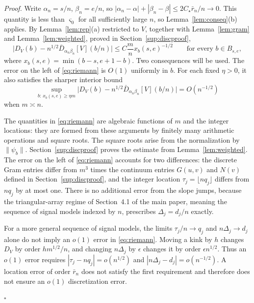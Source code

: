 \documentclass[12pt, a4paper]{article}
\newcommand{\qed}{\hfill$\square$}
\newenvironment{proof}[1][Proof]{\par\noindent\textit{#1.}\space}{\qed\par\medskip}
\begin{document}
\begin{proof}
Write $\alpha_n = s/n$, $\beta_n = e/n$, so
$|\alpha_n-\alpha| + |\beta_n-\beta| \le 2C_\star\bar r_n/n \to 0$. This
quantity is less than $\varsigma_0$ for all sufficiently large $n$, so
Lemma~\ref{lem:conseq}(b) applies. By
Lemma~\ref{lem:rep}(a) restricted to $V$, together with Lemma~\ref{lem:gram}
and Lemma~\ref{lem:weighted}, proved in Section~\ref{sup:discproof},
\begin{equation}
\label{eq:riemann}
\Big|D_V(b)-n^{1/2}\bar D_{\alpha_n\beta_n}[V](b/n)\Big|
\le C\frac{m}{n}x_b(s,e)^{-1/2}
\qquad\text{for every }b\in B_{s,e},
\end{equation}
where $x_b(s,e)=\min(b-s,e+1-b)$. Two consequences will be used. The error
on the left of \eqref{eq:riemann} is $O(1)$ uniformly in $b$. For each fixed
$\eta>0$, it also satisfies the sharper interior bound
\begin{equation}
\label{eq:riemann2}
\sup_{b:\,x_b(s,e)\ge\eta m}
\Big|D_V(b)-n^{1/2}\bar D_{\alpha_n\beta_n}[V](b/n)\Big|
=O(n^{-1/2})
\end{equation}
when $m\asymp n$.

The quantities in \eqref{eq:riemann} are algebraic functions of $m$ and the
integer locations: they are formed from these arguments by finitely many
arithmetic operations and square roots. The square roots arise from the
normalization by $\|\psi_b\|$. Section~\ref{sup:discproof} proves the estimate
from Lemma~\ref{lem:weighted}. The error on the left of \eqref{eq:riemann}
accounts for two differences: the discrete Gram entries differ from $m^3$
times the continuum entries $G(u,v)$ and $N(v)$ defined in
Section~\ref{sup:discproof}, and the integer location
$\tau_j=\lfloor nq_j\rfloor$ differs from $nq_j$ by at most one. There is no
additional error from the slope jumps, because the triangular-array regime of
Section~4.1 of the main paper, meaning the sequence of signal models indexed by
$n$, prescribes $\Delta_j=d_j/n$ exactly.

For a more general sequence of signal models, the limits
$\tau_j/n\to q_j$ and $n\Delta_j\to d_j$ alone do not imply an $o(1)$ error in
\eqref{eq:riemann}. Moving a kink by $h$ changes $D_V$ by order
$hm^{1/2}/n$, and changing $n\Delta_j$ by $\epsilon$ changes it by order
$\epsilon n^{1/2}$. Thus an $o(1)$ error requires
$|\tau_j-nq_j|=o(n^{1/2})$ and
$|n\Delta_j-d_j|=o(n^{-1/2})$. A location error of order $\bar r_n$ does not
satisfy the first requirement and therefore does not ensure an $o(1)$
discretization error.


\end{proof}
\end{document}
